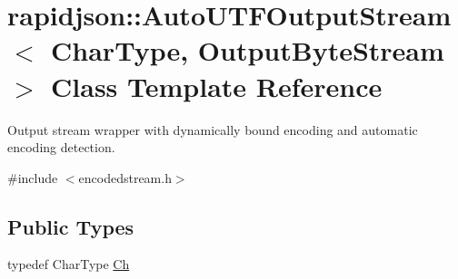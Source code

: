 \hypertarget{classrapidjson_1_1_auto_u_t_f_output_stream}{}\section{rapidjson\+::Auto\+U\+T\+F\+Output\+Stream$<$ Char\+Type, Output\+Byte\+Stream $>$ Class Template Reference}
\label{classrapidjson_1_1_auto_u_t_f_output_stream}


Output stream wrapper with dynamically bound encoding and automatic encoding detection.  




{\ttfamily \#include $<$encodedstream.\+h$>$}

\subsection*{Public Types}
\begin{DoxyCompactItemize}
\item 
typedef Char\+Type \mbox{\hyperlink{classrapidjson_1_1_auto_u_t_f_output_stream_aaf40884d8f4fbf24ea040d3363c9967e}{Ch}}
\end{DoxyCompactItemize}
